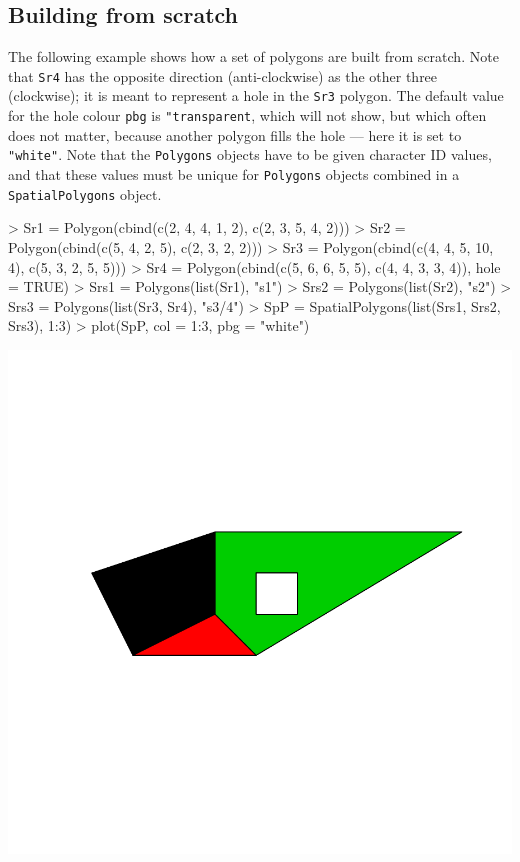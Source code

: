\documentclass{article}
\begin{document}
\subsection{Building from scratch}
The following example shows how a set of polygons are built from scratch.
Note that {\tt Sr4} has the opposite direction (anti-clockwise) as the other three (clockwise);
it is meant to represent a hole in the {\tt Sr3} polygon. The default value for the hole colour {\tt pbg} is {\tt "transparent}, which will not show, but which often does not matter, because another polygon fills the hole --- here it is set to {\tt "white"}. Note that the {\tt Polygons} objects have to be given character ID values, and that these values must be unique for {\tt Polygons} objects combined in a {\tt SpatialPolygons} object.
\begin{Schunk}
\begin{Sinput}
> Sr1 = Polygon(cbind(c(2, 4, 4, 1, 2), c(2, 3, 5, 4, 2)))
> Sr2 = Polygon(cbind(c(5, 4, 2, 5), c(2, 3, 2, 2)))
> Sr3 = Polygon(cbind(c(4, 4, 5, 10, 4), c(5, 3, 2, 5, 5)))
> Sr4 = Polygon(cbind(c(5, 6, 6, 5, 5), c(4, 4, 3, 3, 4)), hole = TRUE)
> Srs1 = Polygons(list(Sr1), "s1")
> Srs2 = Polygons(list(Sr2), "s2")
> Srs3 = Polygons(list(Sr3, Sr4), "s3/4")
> SpP = SpatialPolygons(list(Srs1, Srs2, Srs3), 1:3)
> plot(SpP, col = 1:3, pbg = "white")
\end{Sinput}
\end{Schunk}
\includegraphics{sp-023}
\end{document}
